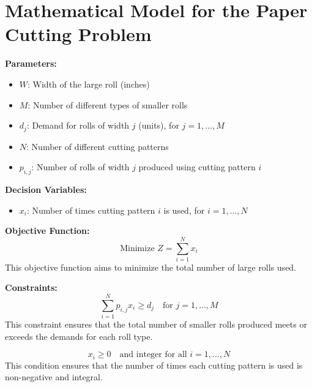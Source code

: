 \documentclass{article}
\begin{document}
\section*{Mathematical Model for the Paper Cutting Problem}

\textbf{Parameters:}
\begin{itemize}
    \item $W$: Width of the large roll (inches)
    \item $M$: Number of different types of smaller rolls
    \item $d_j$: Demand for rolls of width $j$ (units), for $j = 1, \ldots, M$
    \item $N$: Number of different cutting patterns
    \item $p_{i,j}$: Number of rolls of width $j$ produced using cutting pattern $i$
\end{itemize}

\textbf{Decision Variables:}
\begin{itemize}
    \item $x_i$: Number of times cutting pattern $i$ is used, for $i = 1, \ldots, N$
\end{itemize}

\textbf{Objective Function:}
\begin{equation}
\text{Minimize } Z = \sum_{i=1}^{N} x_i
\end{equation}
This objective function aims to minimize the total number of large rolls used.

\textbf{Constraints:}
\begin{equation}
\sum_{i=1}^{N} p_{i,j} x_i \geq d_j \quad \text{for } j = 1, \ldots, M
\end{equation}
This constraint ensures that the total number of smaller rolls produced meets or exceeds the demands for each roll type.

\begin{equation}
x_i \geq 0 \quad \text{and integer for all } i = 1, \ldots, N
\end{equation}
This condition ensures that the number of times each cutting pattern is used is non-negative and integral.
\end{document}
